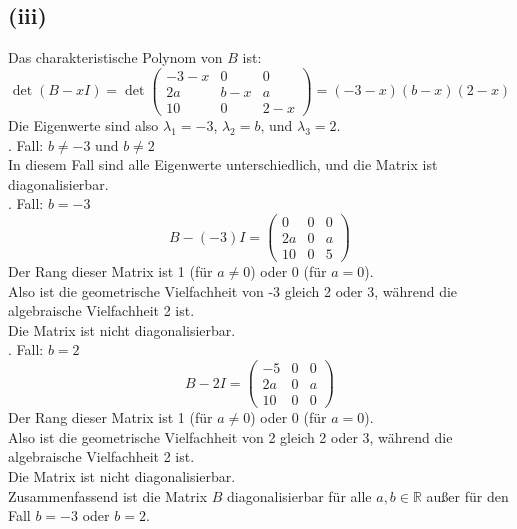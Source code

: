 \documentclass{article}
\begin{document}
\subsection*{(iii)} 
Das charakteristische Polynom von $B$ ist:
\[\det(B - xI) = \det \begin{pmatrix} -3 - x & 0 & 0 \\ 2a & b - x & a \\ 10 & 0 & 2 - x \end{pmatrix} = (-3 - x)(b - x)(2 - x)\]
Die Eigenwerte sind also $\lambda_1 = -3$, $\lambda_2 = b$, und $\lambda_3 = 2$. \\ . Fall: $b \neq -3$ und $b \neq 2$ \\
In diesem Fall sind alle Eigenwerte unterschiedlich, und die Matrix ist diagonalisierbar. \\ . Fall: $b = -3$ 
\[B - (-3)I = \begin{pmatrix} 0 & 0 & 0 \\ 2a & 0 & a \\ 10 & 0 & 5 \end{pmatrix}\]
Der Rang dieser Matrix ist 1 (für $a \neq 0$) oder 0 (für $a = 0$). \\
Also ist die geometrische Vielfachheit von -3 gleich 2 oder 3, während die algebraische Vielfachheit 2 ist.\\
Die Matrix ist nicht diagonalisierbar. \\ . Fall: $b = 2$
\[B - 2I = \begin{pmatrix} -5 & 0 & 0 \\ 2a & 0 & a \\ 10 & 0 & 0 \end{pmatrix}\]
Der Rang dieser Matrix ist 1 (für $a \neq 0$) oder 0 (für $a = 0$).  \\
Also ist die geometrische Vielfachheit von 2 gleich 2 oder 3, während die algebraische Vielfachheit 2 ist. \\
Die Matrix ist nicht diagonalisierbar. \\ \newline
Zusammenfassend ist die Matrix $B$ diagonalisierbar für alle $a, b \in \mathbb{R}$ außer für den Fall $b = -3$ oder $b = 2$.
\end{document}

